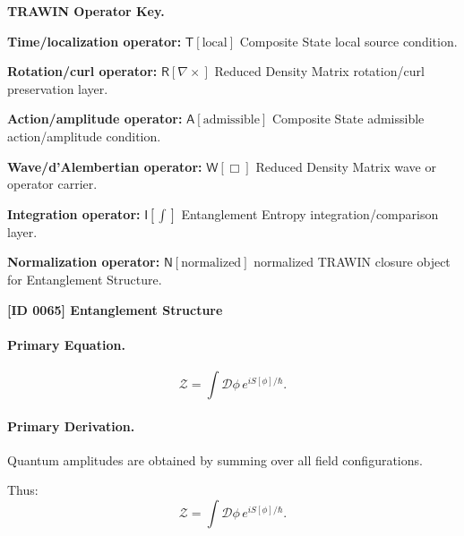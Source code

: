 \par\vspace{0.45\baselineskip}
\noindent\begin{minipage}[t]{\linewidth}
\begingroup
\small
\raggedright
\textbf{TRAWIN Operator Key.}\par
\noindent\textbf{Time/localization operator:} $\mathsf{T}\!\left[\mathrm{local}\right]$ Composite State local source condition.\par
\noindent\textbf{Rotation/curl operator:} $\mathsf{R}\!\left[\nabla\times\right]$ Reduced Density Matrix rotation/curl preservation layer.\par
\noindent\textbf{Action/amplitude operator:} $\mathsf{A}\!\left[\mathrm{admissible}\right]$ Composite State admissible action/amplitude condition.\par
\noindent\textbf{Wave/d'Alembertian operator:} $\mathsf{W}\!\left[\Box\right]$ Reduced Density Matrix wave or operator carrier.\par
\noindent\textbf{Integration operator:} $\mathsf{I}\!\left[\int\right]$ Entanglement Entropy integration/comparison layer.\par
\noindent\textbf{Normalization operator:} $\mathsf{N}\!\left[\mathrm{normalized}\right]$ normalized TRAWIN closure object for Entanglement Structure.\par
\endgroup
\end{minipage}

\clearpage
\noindent\textbf{[ID 0065] Entanglement Structure}\par
\vspace{0.35em}
\paragraph{Primary Equation.}
\begin{equation}
\mathcal{Z}
=
\int \mathcal{D}\phi \, e^{iS[\phi]/\hbar}.
\end{equation}

\paragraph{Primary Derivation.}
Quantum amplitudes are obtained by summing over all field configurations.

Thus:
\begin{equation}
\boxed{
\mathcal{Z}
=
\int \mathcal{D}\phi \, e^{iS[\phi]/\hbar}.
}
\end{equation}


